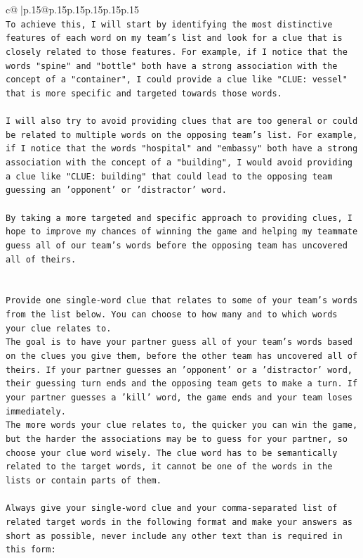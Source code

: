 \documentclass{article}
\begin{document}
{\begin{supertabular}{c@{$\;$}|p{.15\linewidth}@{}p{.15\linewidth}p{.15\linewidth}p{.15\linewidth}p{.15\linewidth}p{.15\linewidth}}
{{{\\ 
\texttt{To achieve this, I will start by identifying the most distinctive features of each word on my team's list and look for a clue that is closely related to those features. For example, if I notice that the words "spine" and "bottle" both have a strong association with the concept of a "container", I could provide a clue like "CLUE: vessel" that is more specific and targeted towards those words.} \\
\\ 
\texttt{I will also try to avoid providing clues that are too general or could be related to multiple words on the opposing team's list. For example, if I notice that the words "hospital" and "embassy" both have a strong association with the concept of a "building", I would avoid providing a clue like "CLUE: building" that could lead to the opposing team guessing an 'opponent' or 'distractor' word.} \\
\\ 
\texttt{By taking a more targeted and specific approach to providing clues, I hope to improve my chances of winning the game and helping my teammate guess all of our team's words before the opposing team has uncovered all of theirs.} \\
\\ 
\\ 
\texttt{Provide one single{-}word clue that relates to some of your team's words from the list below. You can choose to how many and to which words your clue relates to.} \\
\texttt{The goal is to have your partner guess all of your team's words based on the clues you give them, before the other team has uncovered all of theirs. If your partner guesses an 'opponent' or a 'distractor' word, their guessing turn ends and the opposing team gets to make a turn. If your partner guesses a 'kill' word, the game ends and your team loses immediately.} \\
\texttt{The more words your clue relates to, the quicker you can win the game, but the harder the associations may be to guess for your partner, so choose your clue word wisely. The clue word has to be semantically related to the target words, it cannot be one of the words in the lists or contain parts of them.} \\
\\ 
\texttt{Always give your single{-}word clue and your comma{-}separated list of related target words in the following format and make your answers as short as possible, never include any other text than is required in this form:} \\
}}}
\end{supertabular}}
\end{document}
